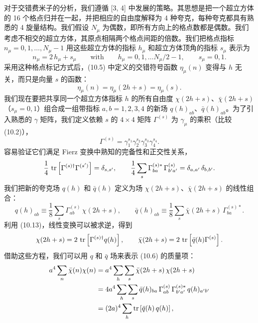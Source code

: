 对于交错费米子的分析，我们遵循 [3, 4] 中发展的策略。其思想是把一个超立方体的 16 个格点归并在一起，并把相应的自由度解释为 4 种夸克，每种夸克都具有熟悉的 4 旋量结构。我们假设 $N_\mu$ 为偶数，即所有方向上的格点数都是偶数。我们考虑不相交的超立方体，其原点相隔两个格点间距的倍数。我们把格点指标 $n_\mu = 0, 1, \ldots, N_\mu - 1$ 用这些超立方体的指标 $h_\mu$ 和超立方体顶角的指标 $s_\mu$ 表示为
\begin{equation}
  n_\mu = 2\,h_\mu + s_\mu
  \qquad \text{with} \qquad
  h_\mu = 0, 1, \ldots N_\mu/2 - 1 , \qquad
  s_\mu = 0, 1 .
\end{equation}
采用这种格点标记方式后，(10.5) 中定义的交错符号函数 $\eta_\mu(n)$ 变得与 $h$ 无关，而只是向量 $s$ 的函数：
\begin{equation}
  \eta_\mu(n) = \eta_\mu(2h + s) = \eta_\mu(s) .
\end{equation}
我们现在要把共享同一个超立方体指标 $h$ 的所有自由度 $\chi(2h+s)$、$\bar\chi(2h+s)$（$s_\mu = 0, 1$）组合成一组带指标 $a, b = 1, 2, 3, 4$ 的新场 $q(h)_{ab}$、$\bar q(h)_{ab}$。为了引入熟悉的 $\gamma$ 矩阵，我们定义依赖 $s$ 的 $4\times 4$ 矩阵 $\Gamma^{(s)}$ 为 $\gamma_\mu$ 的乘积（比较 (10.2)），
\begin{equation}
  \Gamma^{(s)} = \gamma_1^{s_1}\gamma_2^{s_2}\gamma_3^{s_3}\gamma_4^{s_4} .
\end{equation}
容易验证它们满足 Fierz 变换中熟知的完备性和正交性关系，
\begin{equation}
  \frac{1}{4}\,\operatorname{tr}\left[\Gamma^{(s)\dagger}\Gamma^{(s')}\right]
  = \delta_{s,s'} , \qquad
  \frac{1}{4}\sum_s \Gamma^{(s)*}_{ba}\,\Gamma^{(s)}_{b'a'}
  = \delta_{a,a'}\,\delta_{b,b'} .
\end{equation}
我们把新的夸克场 $q(h)$ 和 $\bar q(h)$ 定义为场 $\chi(2h+s)$、$\bar\chi(2h+s)$ 的线性组合：
\begin{equation}
  q(h)_{ab} \equiv \frac{1}{8}\sum_s \Gamma^{(s)}_{ab}\,\chi(2h+s) , \qquad
  \bar q(h)_{ab} \equiv \frac{1}{8}\sum_s
  \bar\chi(2h+s)\,\Gamma^{(s)*}_{ba} .
\end{equation}
利用 (10.13)，线性变换可以被求逆，得到
\begin{equation}
  \chi(2h+s) = 2\,\operatorname{tr}\left[\Gamma^{(s)\dagger}q(h)\right] , \qquad
  \bar\chi(2h+s) = 2\,\operatorname{tr}\left[\bar q(h)\Gamma^{(s)}\right] .
\end{equation}
借助这些方程，我们可以用 $q$ 和 $\bar q$ 场来表示 (10.6) 的质量项：
\begin{equation}
  \begin{split}
    a^4\sum_n \bar\chi(n)\chi(n)
    &= a^4\sum_h\sum_s \bar\chi(2h+s)\,\chi(2h+s) \\
    &= 4a^4\sum_h\sum_s
       \bar q(h)_{ba}\,\Gamma^{(s)}_{ab}\,\Gamma^{(s)*}_{b'a'}\,q(h)_{a'b'} \\
    &= (2a)^4\sum_h \operatorname{tr}\left[\bar q(h)\,q(h)\right] ,
  \end{split}
\end{equation}
